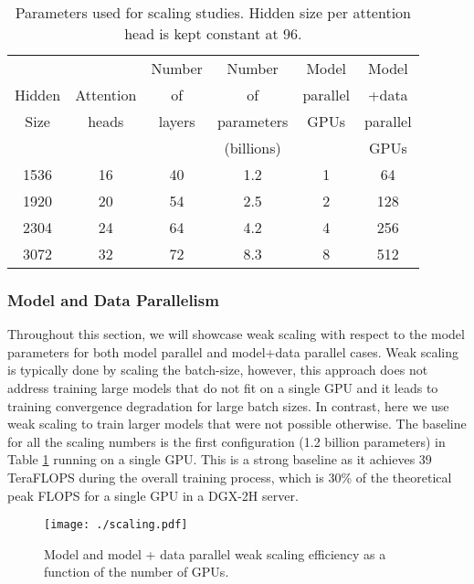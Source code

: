 \documentclass{article}
\begin{document}
\begin{table}
\footnotesize
\begin{center}
\vspace{-3mm}
\caption{Parameters used for scaling studies. Hidden size per attention head is kept constant at 96.}
\vskip 0.15in
\label{tab:params_scaling_studies}
\begin{tabular}{c@{\hskip3pt}|@{\hskip3pt}c@{\hskip3pt}|@{\hskip3pt}c@{\hskip3pt}|@{\hskip3pt}c@{\hskip3pt}|@{\hskip3pt}c@{\hskip3pt}|@{\hskip3pt}c}
\hline \hline
 &  & Number & Number & Model & Model \\
Hidden & Attention & of & of & parallel & +data \\
Size & heads & layers & parameters & GPUs & parallel \\
&  & & (billions) & & GPUs \\ \hline
1536 &	16	& 40	& 1.2	& 1	& 64 \\
1920	& 20	&54	&2.5&	2&	128 \\
2304	&24	&64	&4.2	&4	&256 \\
3072	&32	& 72	&8.3	&8	&512 \\ \hline \hline
\end{tabular}
\end{center}
\vskip -0.1in
\vspace{-3mm}
\end{table}

\subsubsection{Model and Data Parallelism}
Throughout this section, we will showcase weak scaling with respect to the model parameters for both model parallel and model+data parallel cases. Weak scaling is typically done by scaling the batch-size, however, this approach does not address training large models that do not fit on a single GPU and it leads to training convergence degradation for large batch sizes. In contrast, here we use weak scaling to train larger models that were not possible otherwise. The baseline for all the scaling numbers is the first configuration (1.2 billion parameters) in Table \ref{tab:params_scaling_studies} running on a single GPU. This is a strong baseline as it achieves 39 TeraFLOPS during the overall training process, which is 30\% of the theoretical peak FLOPS for a single GPU in a DGX-2H server. 

\begin{figure}
\begin{center}
  \texttt{[image: ./scaling.pdf]}
  \vspace{-1cm}
  \caption{Model and model + data parallel weak scaling efficiency as a function of the number of GPUs.}
  \label{fig:blue_green_mp}
\end{center}
\vspace{-2mm}
\end{figure}
\end{document}
